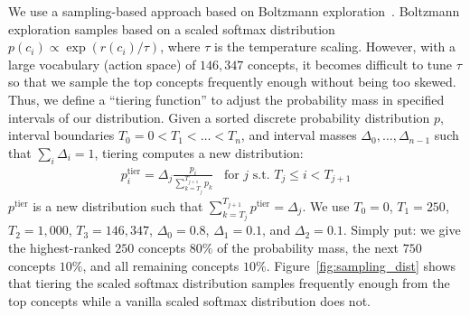 We use a sampling-based approach based on Boltzmann exploration~\cite{sutton1991dyna}. Boltzmann exploration samples based on a scaled softmax distribution $ p(c_i) \propto \exp(r(c_i)/\tau)$, where  
$\tau$ is the temperature scaling.
However, with a large vocabulary (action space) of $146,347$ concepts, it becomes difficult to tune $\tau$ so that we sample the top concepts frequently enough without being too skewed. 
Thus, we define a ``tiering function'' to adjust the probability mass in specified intervals of our distribution. Given a sorted discrete probability distribution $p$, interval boundaries $T_0 =0 < T_1 < \dots < T_n$, and interval masses $\Delta_0, \dots, \Delta_{n-1}$ such that $\sum_i \Delta_i = 1$,  tiering computes a new distribution: 
\begin{align}
    p_i^{\text{tier}} = \Delta_j \frac{p_i}{\sum_{k=T_j}^{T_{j+1}} p_k} \;\;\; \text{for } j \text{  s.t.  }T_j \leq i < T_{j+1} 
\end{align}
$p^{\text{tier}}$ is a new distribution such that $\sum_{k=T_j}^{T_{j+1}} p^{\text{tier}} = \Delta_j$. We use $T_0=0$, $T_1=250$, $T_2=1{,}000$, $T_3=146{,}347$, $\Delta_0=0.8$, $\Delta_1 = 0.1$, and $\Delta_2=0.1$.
Simply put: we give the highest-ranked $250$ concepts $80\%$ of the probability mass, the next $750$ concepts $10\%$, and all remaining concepts $10\%$.
Figure~\ref{fig:sampling_dist} shows that tiering the scaled softmax distribution samples frequently enough from the top concepts while a vanilla scaled softmax distribution does not. 

